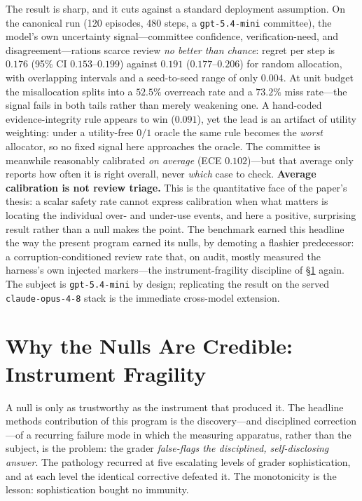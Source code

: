 \documentclass[11pt]{article}
\begin{document}
The result is sharp, and it cuts against a standard deployment assumption. On the canonical run (120 episodes, 480 steps, a \texttt{gpt-5.4-mini} committee), the model's own uncertainty signal---committee confidence, verification-need, and disagreement---rations scarce review \emph{no better than chance}: regret per step is $0.176$ (95\% CI $0.153$--$0.199$) against $0.191$ ($0.177$--$0.206$) for random allocation, with overlapping intervals and a seed-to-seed range of only $0.004$. At unit budget the misallocation splits into a $52.5\%$ overreach rate and a $73.2\%$ miss rate---the signal fails in both tails rather than merely weakening one. A hand-coded evidence-integrity rule appears to win ($0.091$), yet the lead is an artifact of utility weighting: under a utility-free $0/1$ oracle the same rule becomes the \emph{worst} allocator, so no fixed signal here approaches the oracle. The committee is meanwhile reasonably calibrated \emph{on average} (ECE $0.102$)---but that average only reports how often it is right overall, never \emph{which} case to check. \textbf{Average calibration is not review triage.} This is the quantitative face of the paper's thesis: a scalar safety rate cannot express calibration when what matters is locating the individual over- and under-use events, and here a positive, surprising result rather than a null makes the point. The benchmark earned this headline the way the present program earned its nulls, by demoting a flashier predecessor: a corruption-conditioned review rate that, on audit, mostly measured the harness's own injected markers---the instrument-fragility discipline of \S\ref{sec:instrument} again. The subject is \texttt{gpt-5.4-mini} by design; replicating the result on the served \texttt{claude-opus-4-8} stack is the immediate cross-model extension.

\section{Why the Nulls Are Credible: Instrument Fragility}
\label{sec:instrument}

A null is only as trustworthy as the instrument that produced it. The headline methods contribution of this program is the discovery---and disciplined correction---of a recurring failure mode in which the measuring apparatus, rather than the subject, is the problem: the grader \emph{false-flags the disciplined, self-disclosing answer}. The pathology recurred at five escalating levels of grader sophistication, and at each level the identical corrective defeated it. The monotonicity is the lesson: sophistication bought no immunity.
\end{document}

